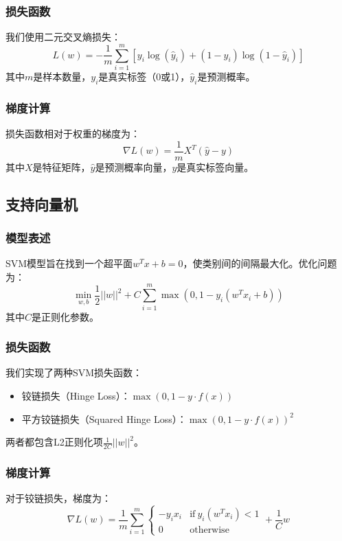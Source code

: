 \documentclass[journal, a4paper]{IEEEtran}
\begin{document}
\begin{CJK}{UTF8}{gbsn}
\subsubsection{损失函数}
我们使用二元交叉熵损失：
\begin{equation}
L(w) = -\frac{1}{m}\sum_{i=1}^{m}[y_i\log(\hat{y}_i) + (1-y_i)\log(1-\hat{y}_i)]
\end{equation}
其中$m$是样本数量，$y_i$是真实标签（0或1），$\hat{y}_i$是预测概率。

\subsubsection{梯度计算}
损失函数相对于权重的梯度为：
\begin{equation}
\nabla L(w) = \frac{1}{m} X^T (\hat{y} - y)
\end{equation}
其中$X$是特征矩阵，$\hat{y}$是预测概率向量，$y$是真实标签向量。

\subsection{支持向量机}
\subsubsection{模型表述}
SVM模型旨在找到一个超平面$w^T x + b = 0$，使类别间的间隔最大化。优化问题为：
\begin{equation}
\min_{w,b} \frac{1}{2} ||w||^2 + C\sum_{i=1}^{m} \max(0, 1 - y_i(w^T x_i + b))
\end{equation}
其中$C$是正则化参数。

\subsubsection{损失函数}
我们实现了两种SVM损失函数：

\begin{itemize}
    \item 铰链损失（Hinge Loss）：$\max(0, 1 - y \cdot f(x))$
    \item 平方铰链损失（Squared Hinge Loss）：$\max(0, 1 - y \cdot f(x))^2$
\end{itemize}

两者都包含L2正则化项$\frac{1}{2C} ||w||^2$。

\subsubsection{梯度计算}
对于铰链损失，梯度为：
\begin{equation}
\nabla L(w) = \frac{1}{m}\sum_{i=1}^{m} \begin{cases} 
-y_i x_i & \text{if}\ y_i(w^T x_i) < 1 \\
0 & \text{otherwise}
\end{cases} + \frac{1}{C}w
\end{equation}


\end{CJK}
\end{document}

